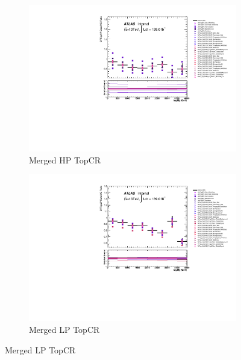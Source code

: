 \begin{figure}[ht]
    \centering
    \begin{subfigure}[b]{0.3\textwidth}
        \centering
        \includegraphics[width=\textwidth]{figures/1lep/VTaggerUnc/VTagCRTopHPtagMjj_SystBreakDown.pdf}
        \caption{Merged HP TopCR}
        \label{fig:MergedHPTopCR}
    \end{subfigure}
    \begin{subfigure}[b]{0.3\textwidth}
        \centering
        \includegraphics[width=\textwidth]{figures/1lep/VTaggerUnc/VTagCRTopLPtagMjj_SystBreakDown.pdf}
        \caption{Merged LP TopCR}
        \label{fig:MergedLPTopCR}
    \end{subfigure}

\end{figure}
